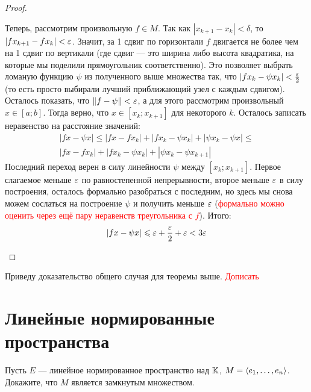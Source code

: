 \begin{proof}
\begin{itemize}
		Теперь, рассмотрим произвольную $f \in M$. Так как $|x_{k + 1} - x_k| < \delta$, то $|fx_{k + 1} - fx_k| < \varepsilon$. Значит, за 1 сдвиг по горизонтали $f$ двигается не более чем на 1 сдвиг по вертикали (где сдвиг --- это ширина либо высота квадратика, на которые мы поделили прямоугольник соответственно). Это позволяет выбрать ломаную функцию $\psi$ из полученного выше множества так, что $|fx_k - \psi x_k| < \frac{\varepsilon}{2}$ (то есть просто выбирали лучший приближающий узел с каждым сдвигом). Осталось показать, что $\|f - \psi\| < \varepsilon$, а для этого рассмотрим произвольный $x \in [a; b]$. Тогда верно, что $x \in [x_k; x_{k + 1}]$ для некоторого $k$. Осталось записать неравенство на расстояние значений:
		\begin{multline*}
			|fx - \psi x| \le |fx - fx_k| + |fx_k - \psi x_k| + |\psi x_k - \psi x| \le
			\\
			|fx - fx_k| + |fx_k - \psi x_k| + |\psi x_k - \psi x_{k + 1}|
		\end{multline*}
		Последний переход верен в силу линейности $\psi$ между $[x_k; x_{k + 1}]$. Первое слагаемое меньше $\varepsilon$ по равностепенной непрерывности, второе меньше $\varepsilon$ в силу построения, осталось формально разобраться с последним, но здесь мы снова можем сослаться на построение $\psi$ и получить меньше $\varepsilon$ (\textcolor{red}{формально можно оценить через ещё пару неравенств треугольника с $f$}). Итого:
		\[
			|fx - \psi x| \leqslant \varepsilon + \frac{\varepsilon}{2} + \varepsilon < 3\varepsilon
		\]
	\end{itemize}
\end{proof}

\begin{anote}
	Приведу доказательство общего случая для теоремы выше. \textcolor{red}{Дописать}
\end{anote}

\section{Линейные нормированные пространства}

\begin{exercise}
	Пусть $E$ --- линейное нормированное пространство над $\mathbb{K}$, $M = \left\langle e_1, \ldots, e_n\right\rangle$. Докажите, что $M$ является замкнутым множеством.
\end{exercise}